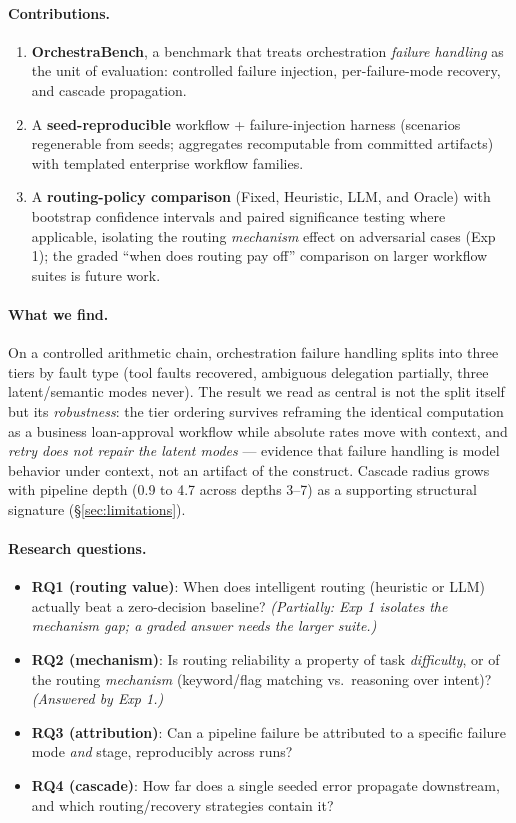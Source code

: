 \documentclass[sigconf,nonacm,anonymous]{acmart}  %
\begin{document}
\paragraph{Contributions.}
\begin{enumerate}
  \item \textbf{OrchestraBench}, a benchmark that treats orchestration
  \emph{failure handling} as the unit of evaluation: controlled failure
  injection, per-failure-mode recovery, and cascade propagation.
  \item A \textbf{seed-reproducible} workflow + failure-injection harness
  (scenarios regenerable from seeds; aggregates recomputable from committed
  artifacts) with templated enterprise workflow families.
  \item A \textbf{routing-policy comparison} (Fixed, Heuristic, LLM, and Oracle)
  with bootstrap confidence intervals and paired significance testing where
  applicable, isolating the routing \emph{mechanism} effect on adversarial cases
  (Exp 1); the graded ``when does routing pay off'' comparison on larger
  workflow suites is future work.
\end{enumerate}

\paragraph{What we find.} On a controlled arithmetic chain, orchestration
failure handling splits into three tiers by fault type (tool faults recovered,
ambiguous delegation partially, three latent/semantic modes never). The result we
read as central is not the split itself but its \emph{robustness}: the tier
ordering survives reframing the identical computation as a business
loan-approval workflow while absolute rates move with context, and \emph{retry
does not repair the latent modes} --- evidence that failure handling is model
behavior under context, not an artifact of the construct. Cascade radius grows
with pipeline depth (0.9 to 4.7 across depths 3--7) as a supporting structural
signature (\S\ref{sec:limitations}).

\paragraph{Research questions.}
\begin{itemize}
  \item \textbf{RQ1 (routing value)}: When does intelligent routing (heuristic or
  LLM) actually beat a zero-decision baseline? \emph{(Partially: Exp 1 isolates
  the mechanism gap; a graded answer needs the larger suite.)}
  \item \textbf{RQ2 (mechanism)}: Is routing reliability a property of task
  \emph{difficulty}, or of the routing \emph{mechanism} (keyword/flag matching
  vs.\ reasoning over intent)? \emph{(Answered by Exp 1.)}
  \item \textbf{RQ3 (attribution)}: Can a pipeline failure be attributed to a
  specific failure mode \emph{and} stage, reproducibly across runs?
  \item \textbf{RQ4 (cascade)}: How far does a single seeded error propagate
  downstream, and which routing/recovery strategies contain it?
\end{itemize}
\end{document}
